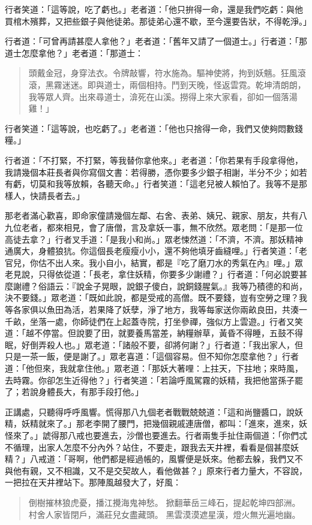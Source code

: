 行者笑道：「這等說，吃了虧也。」老者道：「他只拚得一命，還是我們吃虧：與他買棺木殯葬，又把些銀子與他徒弟。那徒弟心還不歇，至今還要告狀，不得乾淨。」

行者道：「可曾再請甚麼人拿他？」老者道：「舊年又請了一個道士。」行者道：「那道士怎麼拿他？」老者道：「那道士：
\begin{quote}
頭戴金冠，身穿法衣。令牌敲響，符水施為。驅神使將，拘到妖魑。狂風滾滾，黑霧迷迷。即與道士，兩個相持。鬥到天晚，怪返雲霓。乾坤清朗朗，我等眾人齊。出來尋道士，渰死在山溪。撈得上來大家看，卻如一個落湯雞！」
\end{quote}

行者笑道：「這等說，也吃虧了。」老者道：「他也只捨得一命，我們又使夠悶數錢糧。」

行者道：「不打緊，不打緊，等我替你拿他來。」老者道：「你若果有手段拿得他，我請幾個本莊長者與你寫個文書：若得勝，憑你要多少銀子相謝，半分不少；如若有虧，切莫和我等放賴，各聽天命。」行者笑道：「這老兒被人賴怕了。我等不是那樣人，快請長者去。」

那老者滿心歡喜，即命家僮請幾個左鄰、右舍、表弟、姨兄、親家、朋友，共有八九位老者，都來相見，會了唐僧，言及拿妖一事，無不欣然。眾老問：「是那一位高徒去拿？」行者叉手道：「是我小和尚。」眾老悚然道：「不濟，不濟。那妖精神通廣大，身體狼犺。你這個長老瘦瘦小小，還不夠他填牙齒縫哩。」行者笑道：「老官兒，你估不出人來。我小自小，結實，都是『吃了磨刀水的秀氣在內』哩。」眾老見說，只得依從道：「長老，拿住妖精，你要多少謝禮？」行者道：「何必說要甚麼謝禮？俗語云：『說金子晃眼，說銀子傻白，說銅錢腥氣。』我等乃積德的和尚，決不要錢。」眾老道：「既如此說，都是受戒的高僧。既不要錢，豈有空勞之理？我等各家俱以魚田為活，若果降了妖孽，淨了地方，我等每家送你兩畝良田，共湊一千畝，坐落一處，你師徒們在上起蓋寺院，打坐參禪，強似方上雲遊。」行者又笑道：「越不停當。但說要了田，就要養馬當差，納糧辦草，黃昏不得睡，五鼓不得眠，好倒弄殺人也。」眾老道：「諸般不要，卻將何謝？」行者道：「我出家人，但只是一茶一飯，便是謝了。」眾老喜道：「這個容易。但不知你怎麼拿他？」行者道：「他但來，我就拿住他。」眾老道：「那妖大著哩：上拄天，下拄地；來時風，去時霧。你卻怎生近得他？」行者笑道：「若論呼風駕霧的妖精，我把他當孫子罷了；若說身體長大，有那手段打他。」

正講處，只聽得呼呼風響。慌得那八九個老者戰戰兢兢道：「這和尚鹽醬口，說妖精，妖精就來了。」那老李開了腰門，把幾個親戚連唐僧，都叫：「進來，進來，妖怪來了。」諕得那八戒也要進去，沙僧也要進去。行者兩隻手扯住兩個道：「你們忒不循理，出家人怎麼不分內外？站住，不要走，跟我去天井裡，看看是個甚麼妖精？」八戒道：「哥啊，他們都是經過帳的，風響便是妖來。他都去躲，我們又不與他有親，又不相識，又不是交契故人，看他做甚？」原來行者力量大，不容說，一把拉在天井裡站下。那陣風越發大了，好風：
\begin{quote}
倒樹摧林狼虎憂，播江攪海鬼神愁。
掀翻華岳三峰石，提起乾坤四部洲。
村舍人家皆閉戶，滿莊兒女盡藏頭。
黑雲漠漠遮星漢，燈火無光遍地幽。
\end{quote}

